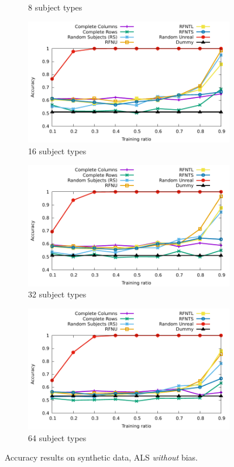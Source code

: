 \documentclass[10pt, conference, compsocconf]{IEEEtran}
\begin{document}
\begin{figure}
\begin{subfigure}[b]{\columnwidth}
        \caption{8 subject types}
\end{subfigure}
\begin{subfigure}[b]{\columnwidth}
        \includegraphics[width=0.8\columnwidth]{data/results/means_of_results/ALS/Synthetic/synthetic_subject_types/ALS-16-types.pdf}
        \caption{16 subject types}
\end{subfigure}
\begin{subfigure}[b]{\columnwidth}
        \includegraphics[width=0.8\columnwidth]{data/results/means_of_results/ALS/Synthetic/synthetic_subject_types/ALS-32-types.pdf}
        \caption{32 subject types}
\end{subfigure}
\hfill
\begin{subfigure}[b]{\columnwidth}
        \includegraphics[width=0.8\columnwidth]{data/results/means_of_results/ALS/Synthetic/synthetic_subject_types/ALS-64-types.pdf}
        \caption{64 subject types}
\end{subfigure}
\caption{Accuracy results on synthetic data, ALS \emph{without} bias.}
\label{fig:results-synthetic}
\end{figure}
\end{document}
